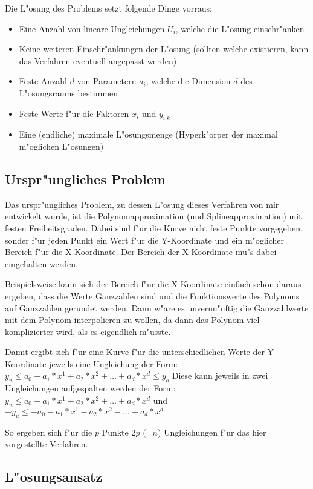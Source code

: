 Die L"osung des Problems setzt folgende Dinge vorraus:
\begin{itemize}
 \item Eine Anzahl von lineare Ungleichungen $U_i$, welche die L"osung einschr"anken
 \item Keine weiteren Einschr"ankungen der L"osung (sollten welche existieren, kann das Verfahren eventuell angepasst werden)
 \item Feste Anzahl $d$ von Parametern $a_i$, welche die Dimension $d$ des L"osungsraums bestimmen
 \item Feste Werte f"ur die Faktoren $x_i$ und $y_{i.k}$
 \item Eine (endliche) maximale L"osungsmenge (Hyperk"orper der maximal m"oglichen L"osungen)
\end{itemize}


\subsection{Urspr"ungliches Problem}

Das urspr"ungliches Problem, zu dessen L"osung dieses Verfahren von mir entwickelt wurde, ist die Polynomapproximation (und Splineapproximation) mit festen Freiheitsgraden.
Dabei sind f"ur die Kurve nicht feste Punkte vorgegeben, sonder f"ur jeden Punkt ein Wert f"ur die Y-Koordinate und ein m"oglicher Bereich f"ur die X-Koordinate. Der Bereich der X-Koordinate mu"s dabei eingehalten werden.

Beispielsweise kann sich der Bereich f"ur die X-Koordinate einfach schon daraus ergeben, dass die Werte Ganzzahlen sind und die Funktionswerte des Polynoms auf Ganzzahlen gerundet werden. Dann w"are es unvernu"nftig die Ganzzahlwerte mit dem Polynom interpolieren zu wollen, da dann das Polynom viel komplizierter wird, als es eigendlich m"usste.

Damit ergibt sich f"ur eine Kurve f"ur die unterschiedlichen Werte der Y-Ko\-or\-di\-na\-te jeweils eine Ungleichung der Form:
$y_u \leq  a_0 + a_1 * x^{1} + a_2 * x^{2} + \ldots + a_d * x^{d} \leq y_o$ 
Diese kann jeweils in zwei Ungleichungen aufgespalten werden der Form: $y_u \leq  a_0 + a_1 * x^{1} + a_2 * x^{2} + \ldots + a_d * x^{d}$ und $-y_u \leq -a_0 - a_1 * x^{1} - a_2 * x^{2} - \ldots - a_d * x^{d}$

So ergeben sich f"ur die $p$ Punkte $2p$ (=$n$) Ungleichungen f"ur das hier vorgestellte Verfahren.


\subsection{L"osungsansatz}

